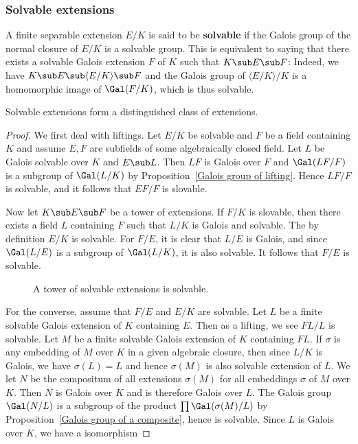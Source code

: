 \subsubsection{Solvable extensions}
A finite separable extension $E/K$ is said to be \textbf{solvable} if the Galois group of the normal closure of $E/K$ is a solvable group. This is equivalent to saying that there exists a solvable Galois extension $F$ of $K$ such that $K\sub E\sub F$: Indeed, we have $K\sub E\sub \langle E/K\rangle\sub F$ and the Galois group of $\langle E/K\rangle/K$ is a homomorphic image of $\Gal(F/K)$, which is thus solvable.
\begin{proposition}\label{field ext solvable distinguished}
Solvable extensions form a distinguished class of extensions.
\end{proposition}
\begin{proof}
We first deal with liftings. Let $E/K$ be solvable and $F$ be a field containing $K$ and assume $E,F$ are subfields of some algebraically closed field. Let $L$ be Galois solvable over $K$ and $E\sub L$. Then $LF$ is Galois over $F$ and $\Gal(LF/F)$ is a subgroup of $\Gal(L/K)$ by Proposition~\ref{Galois group of lifting}. Hence $LF/F$ is solvable, and it follows that $EF/F$ is slovable.\par
Now let $K\sub E\sub F$ be a tower of extensions. If $F/K$ is slovable, then there exists a field $L$ containing $F$ such that $L/K$ is Galois and solvable. The by definition $E/K$ is solvable. For $F/E$, it is clear that $L/E$ is Galois, and since $\Gal(L/E)$ is a subgroup of $\Gal(L/K)$, it is also solvable. It follows that $F/E$ is solvable.\par
\vspace{-3pt}
\begin{figure}[htbp]
\centering
{}
\caption{A tower of solvable extensions is solvable.}
\end{figure}
\vspace{-3pt}
For the converse, assume that $F/E$ and $E/K$ are solvable. Let $L$ be a finite solvable Galois extension of $K$ containing $E$. Then as a lifting, we see $FL/L$ is solvable. Let $M$ be a finite solvable Galois extension of $K$ containing $FL$. If $\sigma$ is any embedding of $M$ over $K$ in a given algebraic closure, then since $L/K$ is Galois, we have $\sigma(L)=L$ and hence $\sigma(M)$ is also solvable extension of $L$. We let $N$ be the compositum of all extensions $\sigma(M)$ for all embeddings $\sigma$ of $M$ over $K$. Then $N$ is Galois over $K$ and is therefore Galois over $L$. The Galois group $\Gal(N/L)$ is a subgroup of the product $\prod\Gal(\sigma(M)/L)$ by Proposition~\ref{Galois group of a composite}, hence is solvable. Since $L$ is Galois over $K$, we have a isomorphism

\end{proof}
